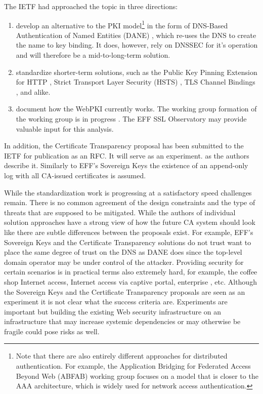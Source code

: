 \documentclass[a4paper, 10pt]{IEEEtran}
\begin{document}
The IETF had approached the topic in three directions: 
\begin{enumerate}
\item develop an alternative to the PKI model\footnote{Note that there are also entirely different approaches for distributed authentication. For example, the Application Bridging for Federated Access Beyond Web (ABFAB) working group \cite{draft-ietf-abfab-arch} focuses on a model that is closer to the AAA architecture, which is widely used for network access authentication.} in the form of DNS-Based Authentication of Named Entities (DANE) \cite{rfc6698}, which re-uses the DNS to create the name to key binding. It does, however, rely on DNSSEC for it's operation and will therefore be a mid-to-long-term solution. 
\item standardize shorter-term solutions, such as the  Public Key Pinning Extension for HTTP \cite{draft-ietf-websec-key-pinning}, Strict Transport Layer Security (HSTS) \cite{rfc6797}, TLS Channel Bindings \cite{rfc5929}, and alike. 
\item document how the WebPKI currently works. The working group formation of the working group is in progress \cite{WPKOPS}. The EFF SSL Observatory \cite{ssl-observatory} may provide valuable input for this analysis. 
\end{enumerate}

In addition, the Certificate Transparency proposal \cite{draft-laurie-pki-sunlight} has been submitted to the IETF for publication as an RFC. It will serve as an experiment. as the authors describe it. Similarly to EFF's Sovereign Keys \cite{sovereign-keys} the existence of an append-only log with all CA-issued certificates is assumed. 

While the standardization work is progressing at a satisfactory speed challenges remain. There is no common agreement of the design constraints and the type of threats that are supposed to be mitigated. While the authors of individual solution approaches have a strong view of how the future CA system should look like there are subtle differences between the proposals exist. For example, EFF's Sovereign Keys and the Certificate Transparency solutions do not trust want to place the same degree of trust on the DNS as DANE does since the top-level domain operator may be under control of the attacker. Providing security for certain scenarios is in practical terms also extremely hard, for example, the coffee shop Internet access, Internet access via captive portal, enterprise , etc. Although the Sovereign Keys and the Certificate Transparency proposals are seen as an experiment it is not clear what the success criteria are. Experiments are important but building the existing Web security infrastructure on an infrastructure that may increase systemic dependencies or may otherwise be fragile could pose risks as well.
\end{document}
